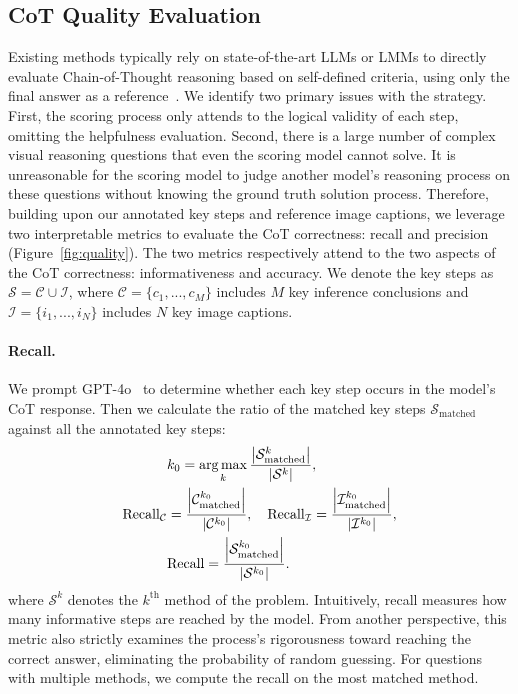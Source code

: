 \subsection{CoT Quality Evaluation}
\label{sec2_evaluation_correctness}
 Existing methods typically rely on state-of-the-art LLMs or LMMs to directly evaluate Chain-of-Thought reasoning based on self-defined criteria, using only the final answer as a reference~\cite{hao2024llm,zhang2024mathverse}. We identify two primary issues with the strategy. First, the scoring process only attends to the logical validity of each step, omitting the helpfulness evaluation. Second, there is a large number of complex visual reasoning questions that even the scoring model cannot solve. It is unreasonable for the scoring model to judge another model's reasoning process on these questions without knowing the ground truth solution process. 
 Therefore, building upon our annotated key steps and reference image captions, we leverage two interpretable metrics to evaluate the CoT correctness: recall and precision (Figure~\ref{fig:quality}). The two metrics respectively attend to the two aspects of the CoT correctness: informativeness and accuracy. We denote the key steps as $\mathcal{S} = \mathcal{C} \cup \mathcal{I}$, where $\mathcal{C} = \{c_1, ..., c_M\}$ includes $M$ key inference conclusions and $\mathcal{I} = \{i_1, ..., i_N\}$ includes $N$ key image captions. 

 
\vspace{-1em}
 \paragraph{Recall.}
 We prompt GPT-4o~\cite{gpt4omini} to determine whether each key step occurs in the model's CoT response. Then we calculate the ratio of the matched key steps $\mathcal{S}_{\text{matched}}$ against all the annotated key steps:
\begin{align}
    &k_0 = \operatorname*{arg\,max}_{k} \frac{\left | \mathcal{S}^{k}_{\text{matched}} \right |}{\left | \mathcal{S}^{k} \right |}, \\
    \text{Recall}_{\mathcal{C}} &= \frac{\left| \mathcal{C}^{k_0}_{\text{matched}} \right|}{\left| \mathcal{C}^{k_0} \right|}, \quad
    \text{Recall}_{\mathcal{I}} = \frac{\left| \mathcal{I}^{k_0}_{\text{matched}} \right|}{\left| \mathcal{I}^{k_0}\right|}, \\
    &\text{Recall} = \frac{\left | \mathcal{S}^{k_0}_{\text{matched}} \right |}{\left | \mathcal{S}^{k_0} \right |}.
\end{align}
 where $\mathcal{S}^{k}$ denotes the $k^{\text{th}}$ method of the problem.
 Intuitively, recall measures how many informative steps are reached by the model. From another perspective, this metric also strictly examines the process's rigorousness toward reaching the correct answer, eliminating the probability of random guessing. For questions with multiple methods, we compute the recall on the most matched method.

